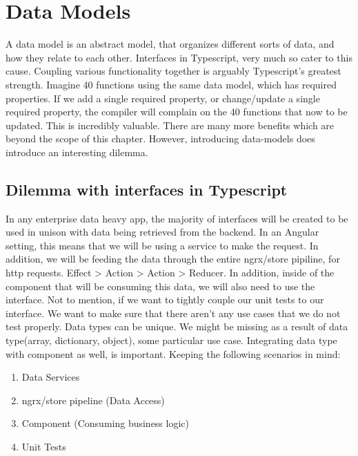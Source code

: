 \section{ Data Models }
\maketitle{}

A data model is an abstract model, that organizes different sorts of data,
and how they relate to each other. Interfaces in Typescript, very much so cater
to this cause. Coupling various functionality together is arguably Typescript's
greatest strength. Imagine 40 functions using the same data model, which has
required properties. If we add a single required property, or change/update
a single required property, the compiler will complain on the 40 functions that
now to be updated. This is incredibly valuable. There are many more benefits
which are beyond the scope of this chapter. However, introducing data-models
does introduce an interesting dilemma.

\subsection{Dilemma with interfaces in Typescript}
In any enterprise data heavy app, the majority of interfaces will
be created to be used in unison with data being retrieved from the backend.
In an Angular setting, this means that we will be using a service to make the
request. In addition, we will be feeding the data through the entire ngrx/store
pipiline, for http requests. Effect > Action > Action > Reducer. In addition,
inside of the component that will be consuming this data, we will also need
to use the interface. Not to mention, if we want to tightly couple our unit
tests to our interface. We want to make sure that there aren't any use cases
that we do not test properly. Data types can be unique. We might be missing as a result of data type(array, dictionary, object), some particular use case.
Integrating data type with component as well, is important. Keeping the
following scenarios in mind:
\begin{enumerate}
  \item Data Services
  \item ngrx/store pipeline (Data Access)
  \item Component (Consuming business logic)
  \item Unit Tests
\end{enumerate}

